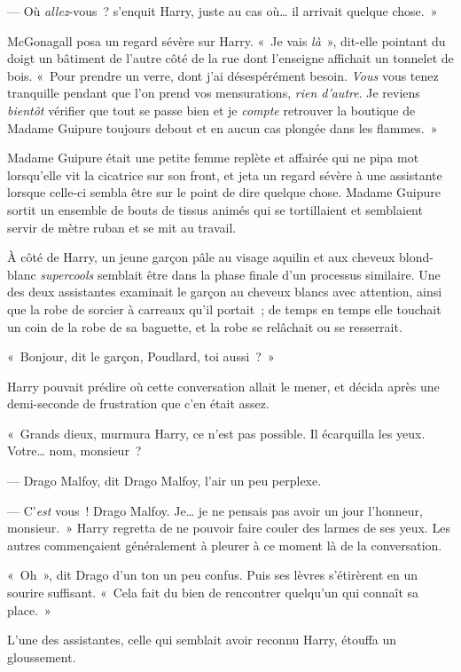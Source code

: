 --- Où \emph{allez}-vous~? s'enquit Harry, juste au cas où… il arrivait quelque chose.~»

McGonagall posa un regard sévère sur Harry. «~Je vais \emph{là}~», dit-elle pointant du doigt un bâtiment de l'autre côté de la rue dont l'enseigne affichait un tonnelet de bois.  «~Pour prendre un verre, dont j'ai désespérément besoin.  \emph{Vous} vous tenez tranquille pendant que l'on prend vos mensurations, \emph{rien d'autre}. Je reviens \emph{bientôt} vérifier que tout se passe bien et je \emph{compte} retrouver la boutique de Madame Guipure toujours debout et en aucun cas plongée dans les flammes.~»

Madame Guipure était une petite femme replète et affairée qui ne pipa mot lorsqu'elle vit la cicatrice sur son front, et jeta un regard sévère à une assistante lorsque celle-ci sembla être sur le point de dire quelque chose. Madame Guipure sortit un ensemble de bouts de tissus animés qui se tortillaient et semblaient servir de mètre ruban et se mit au travail.

À côté de Harry, un jeune garçon pâle au visage aquilin et aux cheveux blond-blanc \emph{supercools} semblait être dans la phase finale d'un processus similaire. Une des deux assistantes examinait le garçon au cheveux blancs avec attention, ainsi que la robe de sorcier à carreaux qu'il portait~; de temps en temps elle touchait un coin de la robe de sa baguette, et la robe se relâchait ou se resserrait.

«~Bonjour, dit le garçon, Poudlard, toi aussi~?~»

Harry pouvait prédire où cette conversation allait le mener, et décida après une demi-seconde de frustration que c'en était assez.

«~Grands dieux, murmura Harry, ce n'est pas possible. Il écarquilla les yeux. Votre… nom, monsieur~?

--- Drago Malfoy, dit Drago Malfoy, l'air un peu perplexe.

--- C'\emph{est} vous~! Drago Malfoy. Je… je ne pensais pas avoir un jour l'honneur, monsieur.~» Harry regretta de ne pouvoir faire couler des larmes de ses yeux. Les autres commençaient généralement à pleurer à ce moment là de la conversation.

«~Oh~», dit Drago d'un ton un peu confus. Puis ses lèvres s'étirèrent en un sourire suffisant. «~Cela fait du bien de rencontrer quelqu'un qui connaît sa place.~»

L'une des assistantes, celle qui semblait avoir reconnu Harry, étouffa un gloussement.

